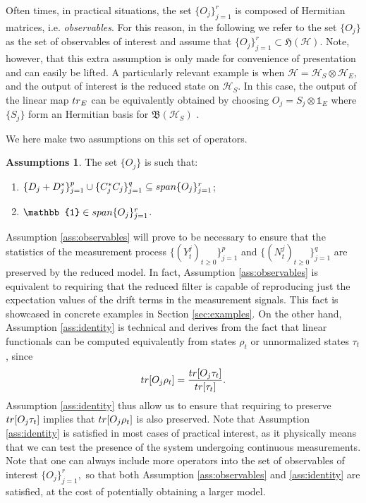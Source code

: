 \documentclass[aihp,12pt]{imsart}
\newcommand{\Hc}{\mathcal{H}}
\newcommand{\Hf}{\mathfrak{H}}
\newcommand{\one}{\mathbb{1}}
\newcommand{\tr}{{\rm tr}}
\newcommand{\Span}{{\rm span}}
\theoremstyle{theorem}
\theoremstyle{definition}
\newtheorem*{assumption*}{Assumptions}
\theoremstyle{remark}
\begin{document}
Often times, in practical situations, the set $\{O_j\}_{j=1}^r$ is composed of Hermitian matrices, i.e. {\em observables}. For this reason, in the following we refer to the set $\{O_j\}$ as the set of observables of interest and assume that $\{O_j\}_{j=1}^r\subset\Hf(\Hc)$. Note, however, that this extra assumption is only made for convenience of presentation and can easily be lifted. 
A particularly relevant example is when $\Hc = \Hc_S\otimes\Hc_E,$ and the output of interest is the reduced state on $\Hc_S$. In this case, the output of the linear map $\tr_E$ can be equivalently obtained by choosing $O_j = S_j\otimes \one_E$ where $\{S_j\}$ form an Hermitian basis for $\mathfrak{B}(\Hc_S)$ \cite{prxq2024}. 

We here make two assumptions on this set of operators. 
\begin{assumption*}
    The set $\{O_j\}$ is such that:
    \begin{enumerate}
        \item $\{D_j+D_j^*\}_{j=1}^p\cup\{C_j^* C_j\}_{j=1}^q\subseteq\Span\{O_j\}_{j=1}^r$; \label{ass:observables}
        \item $\one\in\Span\{O_j\}_{j=1}^r$. \label{ass:identity}
    \end{enumerate}
\end{assumption*}
Assumption \ref{ass:observables} will prove to be necessary to ensure that the statistics of the measurement process $\{(Y_t^j)_{t\geq0}\}_{j=1}^p$ and $\{(N_t^j)_{t\geq0}\}_{j=1}^q$ are preserved by the reduced model. In fact, Assumption \ref{ass:observables} is equivalent to requiring that the reduced filter is capable of reproducing just the expectation values of the drift terms in the measurement signals. This fact is showcased in concrete examples in Section \ref{sec:examples}.
On the other hand, Assumption \ref{ass:identity} is technical and derives from the fact that linear functionals can be computed equivalently from states $\rho_t$ or unnormalized states $\tau_t$, since 
\[\tr[O_j\rho_t] = \frac{\tr[O_j\tau_t]}{\tr[\tau_t]}.\]
Assumption \ref{ass:identity} thus allow us to ensure that requiring to preserve \(\tr[O_j\tau_t]\) implies that \(\tr[O_j\rho_t]\) is also preserved. Note that Assumption \ref{ass:identity} is satisfied in most cases of practical interest, as it physically means that we can test the presence of the system undergoing continuous measurements. Note that one can always include more operators into the set of observables of interest $\{O_j\}_{j=1}^r,$ so that both Assumption \ref{ass:observables} and \ref{ass:identity} are satisfied, at the cost of potentially obtaining a larger model. 
\end{document}
